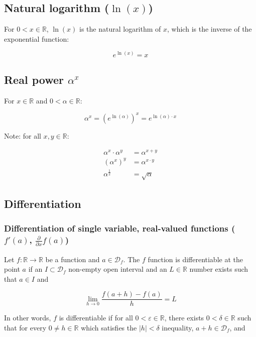 \documentclass{article}
\begin{document}
      \subsection{Natural logarithm ($\ln(x)$)}

        For $0 < x \in \mathbb{R}$, $\ln(x)$ is the natural logarithm of $x$,
        which is the inverse of the exponential function:

        $$e^{\ln(x)} = x$$

      \subsection{Real power $\alpha^x$}

        For $x \in \mathbb{R}$ and $0 < \alpha \in \mathbb{R}$:

        $$
          \alpha^x = \left( e^{\ln(\alpha)} \right)^x = e^{\ln(\alpha) \cdot x}
        $$

        Note: for all $x, y \in \mathbb{R}$:

        \begin{align*}
          \alpha^x \cdot \alpha^y & = \alpha^{x+y} \\
          \left( \alpha^x \right)^y & = \alpha^{x \cdot y} \\
          \alpha^\frac{1}{2} & = \sqrt{\alpha}
        \end{align*}

      \subsection{Differentiation}

        \subsubsection{%
          Differentiation of single variable, real-valued functions
          ($f'(a)$, $\frac{\partial}{\partial x}f(a)$)
        }

          Let $f : \mathbb{R} \rightarrow \mathbb{R}$ be a function and
          $a \in \mathcal{D}_f$. The $f$ function is differentiable at the point
          $a$ if an $I \subset \mathcal{D}_f$ non-empty open interval and an
          $L \in \mathbb{R}$ number exists such that $a \in I$ and

          $$
            \lim_{h \to 0} \frac{f(a+h) - f(a)}{h} = L
          $$

          In other words, $f$ is differentiable if for all
          $0 < \varepsilon \in \mathbb{R}$, there exists
          $0 < \delta \in \mathbb{R}$ such that for every
          $0 \neq h \in \mathbb{R}$ which satisfies the $|h| < \delta$
          inequality, $a+h \in \mathcal{D}_f$, and
\end{document}
